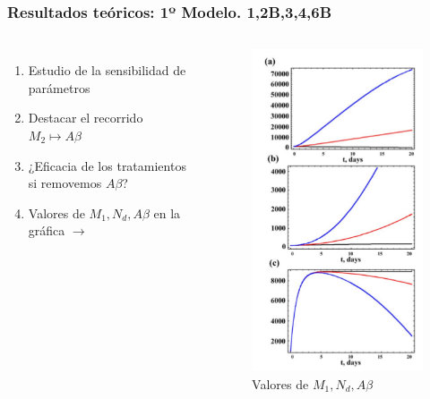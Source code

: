 \documentclass{beamer}
\begin{document}
\begin{frame}
	\frametitle{Resultados teóricos: 1º Modelo. 1,2B,3,4,6B}
\begin{columns}[t]
	    \begin{enumerate}
	    	\item Estudio de la sensibilidad de parámetros
	    	\item Destacar el recorrido $M_2\longmapsto A\beta$
	    	\item ¿Eficacia de los tratamientos si removemos $A\beta$?
	    	\item Valores de $M_1 ,N_d, A\beta$ en la gráfica $\rightarrow$
	    \end{enumerate}
	
	\begin{figure}[Atrofia cerebral]
		\includegraphics[scale=0.32]{primerAB.png}
		\caption{Valores de $M_1 ,N_d, A\beta$}
		\label{cerebro4}
	\end{figure}
\end{columns}
	
\end{frame}
\end{document}

